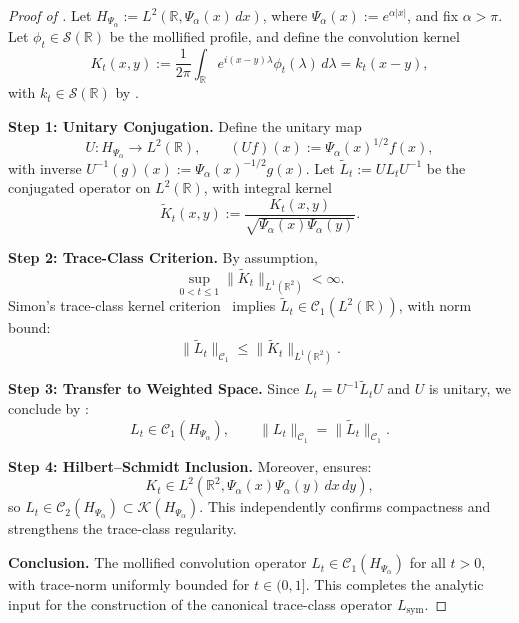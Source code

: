 \begin{proof}[Proof of ]
Let \( H_{\Psi_\alpha} := L^2(\mathbb{R}, \Psi_\alpha(x)\, dx) \), where \( \Psi_\alpha(x) := e^{\alpha |x|} \), and fix \( \alpha > \pi \). Let \( \phi_t \in \mathcal{S}(\mathbb{R}) \) be the mollified profile, and define the convolution kernel
\[
K_t(x, y) := \frac{1}{2\pi} \int_{\mathbb{R}} e^{i(x - y)\lambda} \phi_t(\lambda)\, d\lambda = k_t(x - y),
\]
with \( k_t \in \mathcal{S}(\mathbb{R}) \) by .

\smallskip
\noindent\textbf{Step 1: Unitary Conjugation.}  
Define the unitary map
\[
U : H_{\Psi_\alpha} \to L^2(\mathbb{R}), \qquad (Uf)(x) := \Psi_\alpha(x)^{1/2} f(x),
\]
with inverse \( U^{-1}(g)(x) := \Psi_\alpha(x)^{-1/2} g(x) \). Let \( \widetilde{L}_t := U L_t U^{-1} \) be the conjugated operator on \( L^2(\mathbb{R}) \), with integral kernel
\[
\widetilde{K}_t(x, y) := \frac{K_t(x, y)}{\sqrt{\Psi_\alpha(x) \Psi_\alpha(y)}}.
\]

\smallskip
\noindent\textbf{Step 2: Trace-Class Criterion.}  
By assumption,
\[
\sup_{0 < t \le 1} \| \widetilde{K}_t \|_{L^1(\mathbb{R}^2)} < \infty.
\]
Simon’s trace-class kernel criterion~\cite[Thm.~4.2]{Simon2005TraceIdeals} implies \( \widetilde{L}_t \in \mathcal{C}_1(L^2(\mathbb{R})) \), with norm bound:
\[
\| \widetilde{L}_t \|_{\mathcal{C}_1} \le \| \widetilde{K}_t \|_{L^1(\mathbb{R}^2)}.
\]

\smallskip
\noindent\textbf{Step 3: Transfer to Weighted Space.}  
Since \( L_t = U^{-1} \widetilde{L}_t U \) and \( U \) is unitary, we conclude by :
\[
L_t \in \mathcal{C}_1(H_{\Psi_\alpha}), \qquad \| L_t \|_{\mathcal{C}_1} = \| \widetilde{L}_t \|_{\mathcal{C}_1}.
\]

\smallskip
\noindent\textbf{Step 4: Hilbert–Schmidt Inclusion.}  
Moreover,  ensures:
\[
K_t \in L^2(\mathbb{R}^2, \Psi_\alpha(x) \Psi_\alpha(y)\, dx\, dy),
\]
so \( L_t \in \mathcal{C}_2(H_{\Psi_\alpha}) \subset \mathcal{K}(H_{\Psi_\alpha}) \). This independently confirms compactness and strengthens the trace-class regularity.

\smallskip
\noindent\textbf{Conclusion.}  
The mollified convolution operator \( L_t \in \mathcal{C}_1(H_{\Psi_\alpha}) \) for all \( t > 0 \), with trace-norm uniformly bounded for \( t \in (0,1] \). This completes the analytic input for the construction of the canonical trace-class operator \( L_{\mathrm{sym}} \).
\end{proof}
